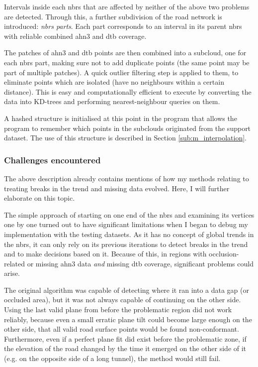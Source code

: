 Intervals inside each \ac{nbrs} that are affected by neither of the above two problems are detected. Through this, a further subdivision of the road network is introduced: \textit{\ac{nbrs} parts}. Each part corresponds to an interval in its parent \ac{nbrs} with reliable combined \ac{ahn3} and \ac{dtb} coverage.

The patches of \ac{ahn3} and \ac{dtb} points are then combined into a subcloud, one for each \ac{nbrs} part, making sure not to add duplicate points (the same point may be part of multiple patches). A quick outlier filtering step is applied to them, to eliminate points which are isolated (have no neighbours within a certain distance). This is easy and computationally efficient to execute by converting the data into KD-trees and performing nearest-neighbour queries on them.

A hashed structure is initialised at this point in the program that allows the program to remember which points in the subclouds originated from the support dataset. The use of this structure is described in Section \ref{sub:m_interpolation}.

\subsubsection{Challenges encountered}

The above description already contains mentions of how my methods relating to treating breaks in the trend and missing data evolved. Here, I will further elaborate on this topic.

The simple approach of starting on one end of the \ac{nbrs} and examining its vertices one by one turned out to have significant limitations when I began to debug my implementation with the testing datasets. As it has no concept of global trends in the \ac{nbrs}, it can only rely on its previous iterations to detect breaks in the trend and to make decisions based on it. Because of this, in regions with occlusion-related or missing \ac{ahn3} data \textit{and} missing \ac{dtb} coverage, significant problems could arise.

The original algorithm was capable of detecting where it ran into a data gap (or occluded area), but it was not always capable of continuing on the other side. Using the last valid plane from before the problematic region did not work reliably, because even a small erratic plane tilt could become large enough on the other side, that all valid road surface points would be found non-conformant. Furthermore, even if a perfect plane fit did exist before the problematic zone, if the elevation of the road changed by the time it emerged on the other side of it (e.g. on the opposite side of a long tunnel), the method would still fail.

